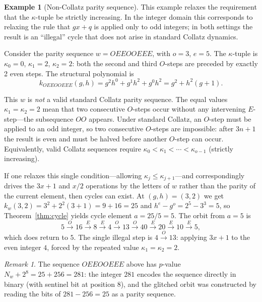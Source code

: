 \documentclass[12pt]{article}
\theoremstyle{definition}
\newtheorem{example}[theorem]{Example}
\theoremstyle{remark}
\newtheorem{remark}[theorem]{Remark}
\newcommand{\kpoly}{k}
\begin{document}
\begin{example}[Non-Collatz parity sequence]
\label{ex:noncollatz}
This example relaxes the requirement that the $\kappa$-tuple be strictly
increasing.  In the integer domain this corresponds to relaxing the rule
that $gx+q$ is applied only to odd integers; in both settings the result
is an ``illegal'' cycle that does not arise in standard Collatz dynamics.

Consider the parity sequence $w = OEEOOEEE$, with $o = 3$, $e = 5$.
The $\kappa$-tuple is $\kappa_0 = 0$, $\kappa_1 = 2$, $\kappa_2 = 2$:
both the second and third $O$-steps are preceded by exactly 2 even steps.
The structural polynomial is
\[
  \kpoly_{OEEOOEEE}(g,h)
    = g^{2}h^{0} + g^{1}h^{2} + g^{0}h^{2}
    = g^2 + h^2(g + 1).
\]

This $w$ is \emph{not} a valid standard Collatz parity sequence.
The equal values $\kappa_1 = \kappa_2 = 2$ mean that two consecutive $O$-steps
occur without any intervening $E$-step---the subsequence $OO$ appears.
Under standard Collatz, an $O$-step must be applied to an odd integer, so
two consecutive $O$-steps are impossible: after $3n+1$ the result is even
and must be halved before another $O$-step can occur.  Equivalently, valid
Collatz sequences require $\kappa_0 < \kappa_1 < \cdots < \kappa_{o-1}$
(strictly increasing).

If one relaxes this single condition---allowing $\kappa_j \le \kappa_{j+1}$---and
correspondingly drives the $3x+1$ and $x/2$ operations by the letters of $w$
rather than the parity of the current element, then cycles can exist.  At
$(g,h) = (3,2)$ we get $\kpoly_w(3,2) = 3^2 + 2^2(3+1) = 9 + 16 = 25$ and
$h^e - g^o = 2^5 - 3^3 = 5$, so Theorem~\ref{thm:cycle} yields cycle element
$a = 25/5 = 5$.  The orbit from $a = 5$ is
\[
  5 \xrightarrow{O} 16 \xrightarrow{E} 8 \xrightarrow{E} 4
    \xrightarrow{O} 13 \xrightarrow{O} 40 \xrightarrow{E} 20
    \xrightarrow{E} 10 \xrightarrow{E} 5,
\]
which does return to $5$.  The single illegal step is $4 \xrightarrow{O} 13$:
applying $3x+1$ to the even integer $4$, forced by the repeated value
$\kappa_1 = \kappa_2 = 2$.
\end{example}

\begin{remark}
The sequence $OEEOOEEE$ above has $p$-value $N_w + 2^8 = 25 + 256 = 281$:
the integer $281$ encodes the sequence directly in binary (with sentinel bit
at position $8$), and the glitched orbit was constructed by reading the bits
of $281 - 256 = 25$ as a parity sequence.
\end{remark}
\end{document}
